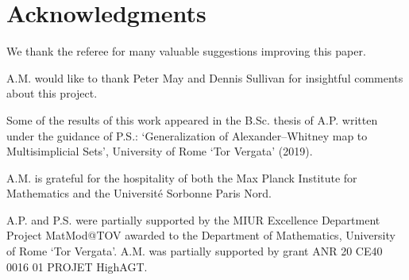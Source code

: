 
\section*{Acknowledgments}

We thank the referee for many valuable suggestions improving this paper.

A.M. would like to thank Peter May and Dennis Sullivan for insightful comments about this project.

Some of the results of this work appeared in the B.Sc. thesis of A.P. written under the guidance of P.S.: `Generalization of Alexander--Whitney map to Multisimplicial Sets', University of Rome `Tor Vergata' (2019).

A.M. is grateful for the hospitality of both the Max Planck Institute for Mathematics and the Universit\'e Sorbonne Paris Nord.

A.P. and P.S. were partially supported by the MIUR Excellence Department Project MatMod@TOV awarded to the Department of Mathematics, University of Rome `Tor Vergata'.
A.M. was partially supported by grant ANR 20 CE40 0016 01 PROJET HighAGT.